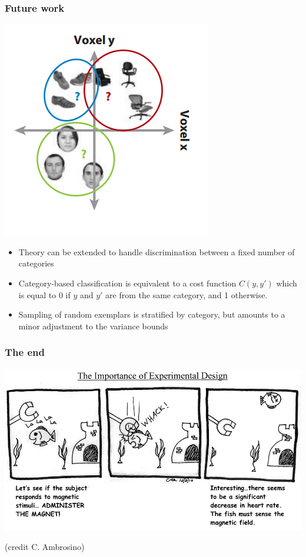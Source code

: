 \documentclass{beamer}
\begin{document}
\begin{frame}
\frametitle{Future work}
\begin{center}
\includegraphics[scale = 0.3]{haxby_example.png}
\end{center}
\begin{itemize}
\item Theory can be extended to handle discrimination between a fixed number of categories
\item Category-based classification is equivalent to a cost function $C(y,y')$ which is equal to 0 if $y$ and $y'$ are from the same category, and 1 otherwise.
\item Sampling of random exemplars is stratified by category, but amounts to a minor adjustment to the variance bounds
\end{itemize}
\end{frame}


\begin{frame}
\frametitle{The end}
\begin{center}
\includegraphics[scale = 1]{c_ambrosino.jpg}


{\tiny(credit C. Ambrosino)}
\end{center}
\end{frame}
\end{document}
